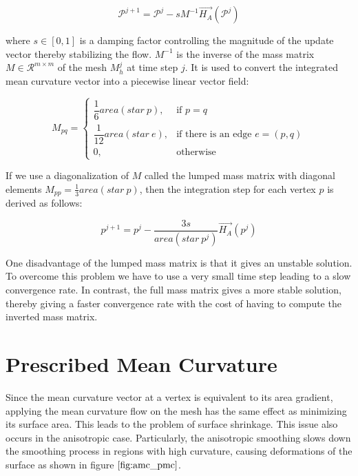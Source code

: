 \documentclass[11pt]{article}
\begin{document}
\begin{equation}
\mathcal{P}^{j+1} = \mathcal{P}^j -sM^{-1}\vec{H_A}(\mathcal{P}^j)
\label{eq:explicit}
\end{equation}

where $s \in [0, 1]$ is a damping factor controlling the magnitude of the update vector thereby stabilizing the flow. $M^{-1}$ is the inverse of the mass matrix $M \in \mathcal{R}^{m \times m}$ of the mesh $M^j_h$ at time step $j$. It is used to convert the integrated mean curvature vector into a piecewise linear vector field:

\begin{equation}
M_{pq} = 
\begin{cases} \dfrac{1}{6}area(star\ p), & \mbox{if } p=q \\ 
\dfrac{1}{12}area(star\ e), & \mbox{if there is an edge } e=(p, q) \\
0, & \mbox{otherwise} \end{cases}
\label{eq:mass_matrix}
\end{equation}

If we use a diagonalization of $M$ called the lumped mass matrix with diagonal elements $M_{pp} = \frac{1}{3} area(star\ p)$, then the integration step for each vertex $p$ is derived as follows:

\begin{equation}
p^{j+1} = p^{j} - \dfrac{3s}{area(star\ p^j)}\vec{H_A}(p^j)
\end{equation}

One disadvantage of the lumped mass matrix is that it gives an unstable solution. To overcome this problem we have to use a very small time step leading to a slow convergence rate. In contrast, the full mass matrix gives a more stable solution, thereby giving a faster convergence rate with the cost of having to compute the inverted mass matrix.

\section{Prescribed Mean Curvature}

Since the mean curvature vector at a vertex is equivalent to its area gradient, applying the mean curvature flow on the mesh has the same effect as minimizing its surface area. This leads to the problem of surface shrinkage. This issue also occurs in the anisotropic case. Particularly, the anisotropic smoothing slows down the smoothing process in regions with high curvature, causing
deformations of the surface as shown in figure $\ref{fig:amc_pmc}$.
\end{document}
